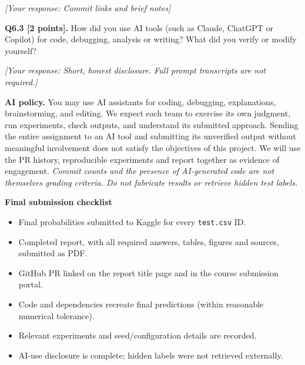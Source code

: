 \documentclass[11pt,letterpaper]{article}
\begin{document}
\textit{[Your response: Commit links and brief notes]}

\newpage

\textbf{Q6.3 [2 points].} How did you use AI tools (such as Claude, ChatGPT or Copilot) for code, debugging, analysis or writing? What did you verify or modify yourself?

\textit{[Your response: Short, honest disclosure. Full prompt transcripts are not required.]}

\vspace{12pt}
\textbf{AI policy.} You may use AI assistants for coding, debugging, explanations, brainstorming, and editing. We expect each team to exercise its own judgment, run experiments, check outputs, and understand its submitted approach. Sending the entire assignment to an AI tool and submitting its unverified output without meaningful involvement does not satisfy the objectives of this project. We will use the PR history, reproducible experiments and report together as evidence of engagement. \textit{Commit counts and the presence of AI-generated code are not themselves grading criteria. Do not fabricate results or retrieve hidden test labels.}

\vspace{18pt}
{\large\textbf{Final submission checklist}}
\vspace{6pt}

\begin{itemize}[leftmargin=*,label=$\square$,itemsep=4pt]
    \item Final probabilities submitted to Kaggle for every \texttt{test.csv} ID.
    \item Completed report, with all required answers, tables, figures and sources, submitted as PDF.
    \item GitHub PR linked on the report title page and in the course submission portal.
    \item Code and dependencies recreate final predictions (within reasonable numerical tolerance).
    \item Relevant experiments and seed/configuration details are recorded.
    \item AI-use disclosure is complete; hidden labels were not retrieved externally.
\end{itemize}
\end{document}
